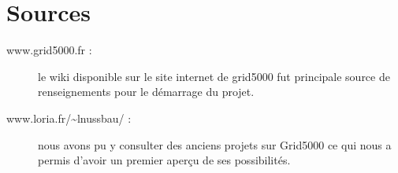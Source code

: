 \chapter{Sources}
\begin{description}
\item[www.grid5000.fr : ]le wiki disponible sur le site internet de grid5000 fut principale source de renseignements pour le démarrage du projet.
\item[www.loria.fr/\sim lnussbau/ : ]nous avons pu y consulter des anciens projets sur Grid5000 ce qui nous a permis d'avoir un premier aperçu de ses possibilités.

\end{description}

